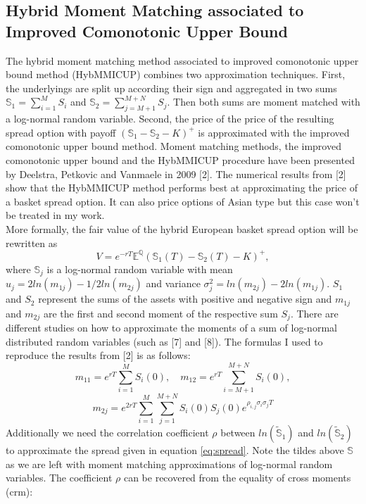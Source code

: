 \documentclass[a4paper]{article}
\begin{document}
\subsection{Hybrid Moment Matching associated to Improved Comonotonic Upper Bound}
\label{sec:hybmmicup}
The hybrid moment matching method associated to improved comonotonic upper bound method (HybMMICUP) combines two approximation techniques. First, the underlyings are split up according their sign and aggregated in two sums 
$\mathbb{S}_1=\sum_{i=1}^MS_i$ and $\mathbb{S}_2=\sum_{j=M+1}^{M+N}S_j.$ Then both sums are moment matched with a log-normal random variable. Second, the price of the price of the resulting spread option with payoff $(\mathbb{S}_1-\mathbb{S}_2-K)^+$ is approximated with the improved comonotonic upper bound method. Moment matching methods, the improved comonotonic upper bound and the HybMMICUP procedure have been presented by Deelstra, Petkovic and Vanmaele in 2009 [2]. The numerical results from [2] show that the HybMMICUP method  performs best at approximating the price of a basket spread option. It can also price options of Asian type but this case won’t be treated in my work.\\
More formally, the fair value of the hybrid European basket spread option will be rewritten as
\begin{equation}
\label{eq:spread}
V = e^{-rT}\mathbb{E}^\mathbb{Q}(\mathbb{S}_1(T) - \mathbb{S}_2(T) - K)^+, 
\end{equation} 
where $\mathbb{S}_j$ is a log-normal random variable with mean $u_j = 2ln(m_{1j}) - 1/2ln(m_{2j})$ and variance $\sigma_j^2 = ln(m_{2j})-2ln(m_{1j}).$
$S_1$ and $S_2$ represent the sums of the assets with positive and negative sign and $m_{1j}$ and $m_{2j}$ are the first and second moment of the respective sum $S_j$. There are different studies on how to approximate the moments of a sum of log-normal distributed random variables (such as [7] and [8]). The formulas I used to reproduce the results from [2] is as follows:
\begin{equation}
m_{11}=e^{rT}\sum_{i=1}^{M}S_i(0), \quad m_{12}=e^{rT}\sum_{i=M+1}^{M+N}S_i(0), 
\end{equation}
\begin{equation}
m_{2j}=e^{2rT}\sum_{i=1}^{M}\sum_{j=1}^{M+N}S_i(0)S_j(0)e^{\rho_{i,j}\sigma_i\sigma_jT}
\end{equation}
Additionally we need the correlation coefficient $\rho$ between $ln(\mathbb{\tilde{S}}_1)$ and $ln(\mathbb{\tilde{S}}_2)$ to approximate the spread given in equation \ref{eq:spread}. Note the tildes above $\mathbb{S}$ as we are left with moment matching approximations of log-normal random variables. The coefficient $\rho$ can be recovered from the equality of cross moments (crm):
\end{document}
